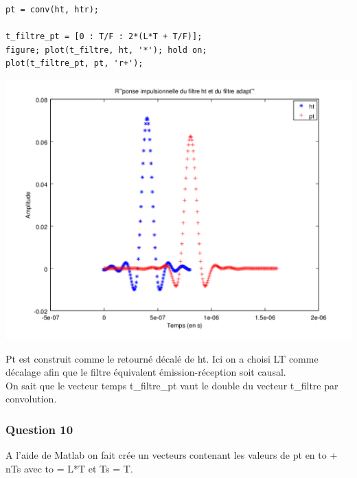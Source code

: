 \documentclass{acm_proc_article-sp}
\begin{document}
\begin{center}
\begin{lstlisting}
pt = conv(ht, htr);

t_filtre_pt = [0 : T/F : 2*(L*T + T/F)];
figure; plot(t_filtre, ht, '*'); hold on;
plot(t_filtre_pt, pt, 'r+');
\end{lstlisting}

\includegraphics[scale=0.45]{ht_pt_9.png}
\end{center}

Pt est construit comme le retourné décalé de ht. Ici on a choisi LT comme décalage afin que le filtre équivalent émission-réception soit causal.\\
On sait que le vecteur temps t\_filtre\_pt vaut le double du vecteur t\_filtre par convolution.

\subsubsection{Question 10}

A l'aide de Matlab on fait crée un vecteurs contenant les valeurs de pt en to + nTs avec to = L*T et Ts = T.
\end{document}
